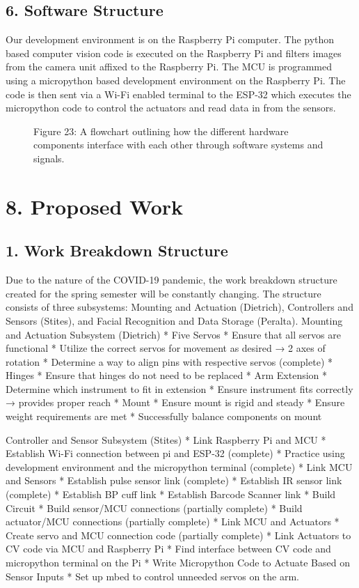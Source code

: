 ﻿\documentclass[10pt]{article}
\begin{document}
\subsection{6. Software Structure}
Our development environment is on the Raspberry Pi computer. The python based computer vision code is executed on the Raspberry Pi and filters images from the camera unit affixed to the Raspberry Pi. The MCU is programmed using a micropython based development environment on the Raspberry Pi. The code is then sent via a Wi-Fi enabled terminal to the ESP-32 which executes the micropython code to control the actuators and read data in from the sensors. 
\begin{figure}
\caption{Figure 23: A flowchart outlining how the different hardware components interface with each other through software systems and signals.}
\label{fig:23}
\end{figure}

\section{8. Proposed Work}
\subsection{1. Work Breakdown Structure}
Due to the nature of the COVID-19 pandemic, the work breakdown structure created for the spring semester will be constantly changing. The structure consists of three subsystems: Mounting and Actuation (Dietrich), Controllers and Sensors (Stites), and Facial Recognition and Data Storage (Peralta).  
Mounting and Actuation Subsystem (Dietrich)
* Five Servos
   * Ensure that all servos are functional
   * Utilize the correct servos for movement as desired → 2 axes of rotation
   * Determine a way to align pins with respective servos (complete)
* Hinges
   * Ensure that hinges do not need to be replaced
* Arm Extension
   * Determine which instrument to fit in extension
   * Ensure instrument fits correctly → provides proper reach
* Mount
   * Ensure mount is rigid and steady 
   * Ensure weight requirements are met
   * Successfully balance components on mount

Controller and Sensor Subsystem (Stites)
* Link Raspberry Pi and MCU
   * Establish Wi-Fi connection between pi and ESP-32 (complete)
   * Practice using development environment and the micropython terminal (complete)
* Link MCU and Sensors
   * Establish pulse sensor link (complete)
   * Establish IR sensor link (complete)
   * Establish BP cuff link
   * Establish Barcode Scanner link
* Build Circuit
   * Build sensor/MCU connections (partially complete)
   * Build actuator/MCU connections (partially complete)
* Link MCU and Actuators
   * Create servo and MCU connection code (partially complete)
* Link Actuators to CV code via MCU and Raspberry Pi
   * Find interface between CV code and micropython terminal on the Pi
* Write Micropython Code to Actuate Based on Sensor Inputs
   * Set up mbed to control unneeded servos on the arm. 
\end{document}
